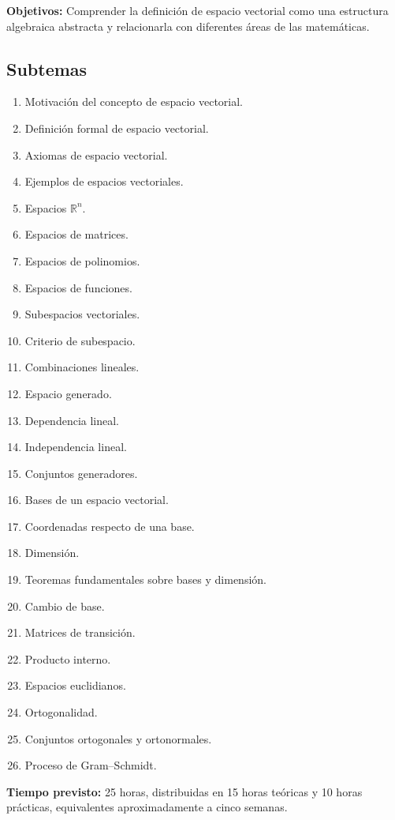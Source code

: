 \documentclass[12pt]{article}
\begin{document}
\textbf{Objetivos:}  Comprender la definición de espacio vectorial como una estructura algebraica abstracta y relacionarla con diferentes áreas de las matemáticas.

\subsection*{Subtemas}

\begin{enumerate}
    \item Motivación del concepto de espacio vectorial.
    \item Definición formal de espacio vectorial.
    \item Axiomas de espacio vectorial.
    \item Ejemplos de espacios vectoriales.
    \item Espacios $\mathbb{R}^n$.
    \item Espacios de matrices.
    \item Espacios de polinomios.
    \item Espacios de funciones.
    \item Subespacios vectoriales.
    \item Criterio de subespacio.
    \item Combinaciones lineales.
    \item Espacio generado.
    \item Dependencia lineal.
    \item Independencia lineal.
    \item Conjuntos generadores.
    \item Bases de un espacio vectorial.
    \item Coordenadas respecto de una base.
    \item Dimensión.
    \item Teoremas fundamentales sobre bases y dimensión.
    \item Cambio de base.
    \item Matrices de transición.
    \item Producto interno.
    \item Espacios euclidianos.
    \item Ortogonalidad.
    \item Conjuntos ortogonales y ortonormales.
    \item Proceso de Gram--Schmidt.
\end{enumerate}

\textbf{Tiempo previsto:} 25 horas, distribuidas en 15 horas teóricas
y 10 horas prácticas, equivalentes aproximadamente a cinco semanas.
\end{document}
